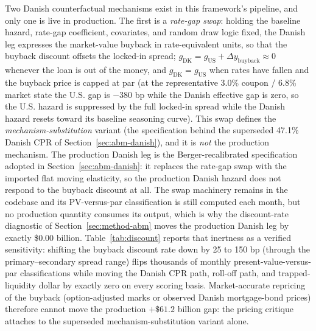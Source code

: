 \documentclass[12pt]{article}
\begin{document}
Two Danish counterfactual mechanisms exist in this framework's pipeline, and only one is live in production. The first is a \emph{rate-gap swap}: holding the baseline hazard, rate-gap coefficient, covariates, and random draw logic fixed, the Danish leg expresses the market-value buyback in rate-equivalent units, so that the buyback discount offsets the locked-in spread; $g_{\mathrm{DK}} = g_{\mathrm{US}} + \Delta y_{\mathrm{buyback}} \approx 0$ whenever the loan is out of the money, and $g_{\mathrm{DK}} = g_{\mathrm{US}}$ when rates have fallen and the buyback price is capped at par (at the representative 3.0\% coupon / 6.8\% market state the U.S. gap is $-380$ bp while the Danish effective gap is zero, so the U.S. hazard is suppressed by the full locked-in spread while the Danish hazard resets toward its baseline seasoning curve). This swap defines the \emph{mechanism-substitution} variant (the specification behind the superseded 47.1\% Danish CPR of Section~\ref{sec:abm-danish}), and it is \emph{not} the production mechanism. The production Danish leg is the Berger-recalibrated specification adopted in Section~\ref{sec:abm-danish}: it replaces the rate-gap swap with the imported flat moving elasticity, so the production Danish hazard does not respond to the buyback discount at all. The swap machinery remains in the codebase and its PV-versus-par classification is still computed each month, but no production quantity consumes its output, which is why the discount-rate diagnostic of Section~\ref{sec:method-abm} moves the production Danish leg by exactly \$0.00 billion. Table~\ref{tab:discount} reports that inertness as a verified sensitivity: shifting the buyback discount rate down by 25 to 150 bp (through the primary--secondary spread range) flips thousands of monthly present-value-versus-par classifications while moving the Danish CPR path, roll-off path, and trapped-liquidity dollar by exactly zero on every scoring basis. Market-accurate repricing of the buyback (option-adjusted marks or observed Danish mortgage-bond prices) therefore cannot move the production $+\$61.2$ billion gap: the pricing critique attaches to the superseded mechanism-substitution variant alone.
\end{document}
